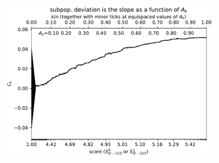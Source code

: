 \documentclass{article}
\newlength{\vertsep}
\newlength{\imsize}
\begin{document}
\begin{figure}
\begin{centering}

\parbox{\imsize}{\includegraphics[width=\imsize]
{../codes/weighted/County_of_Alameda_vs_Placer-LNGI/cumulative.pdf}}

\vspace{\vertsep}


\end{centering}
\end{figure}
\end{document}
